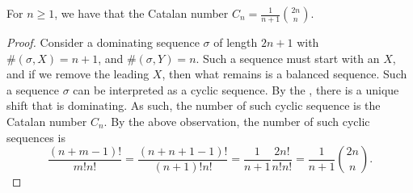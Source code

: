 \begin{theorem}
    For $n \geq 1$, we have that the Catalan number
    $C_n = \frac{1}{n+1} \binom{2n}{n}$.
\end{theorem}
\begin{proof}
    Consider a dominating sequence $\sigma$ of length $2n+1$ with
    $\#(\sigma,X)=n+1$, and $\#(\sigma,Y)=n$. Such a sequence must
    start with an $X$, and if we remove the leading $X$, then what
    remains is a balanced sequence. Such a sequence $\sigma$ can be
    interpreted as a cyclic sequence. By the , there is a unique shift that is
    dominating. As such, the number of such cyclic sequence is the
    Catalan number $C_n$.  By the above observation, the number of
    such cyclic sequences is
    \begin{equation*}
        \frac{(n+m-1)!}{m! n!}%
        =%
        \frac{(n+n+1-1)!}{(n+1)!n!}%
        =%
        \frac{1}{n+1}
        \frac{2n!}{n!n!}%
        =%
        \frac{1}{n+1}
        \binom{2n}{n}.
    \end{equation*}
\end{proof}



